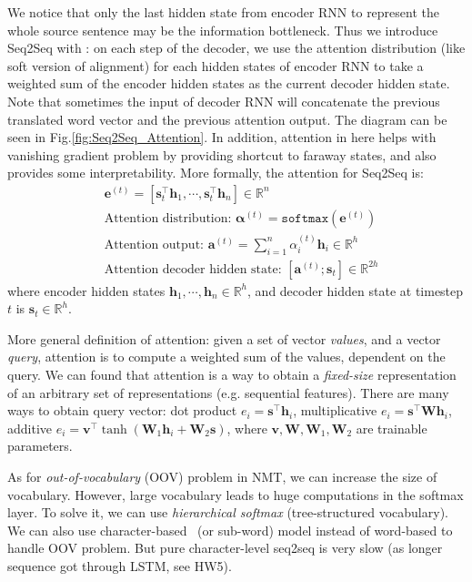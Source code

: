We notice that only the last hidden state from encoder RNN to represent the whole source sentence may be the information bottleneck.
Thus we introduce Seq2Seq with : on each step of the decoder, we use the attention distribution (like soft version of alignment) for each hidden states of encoder RNN to take a weighted sum of the encoder hidden states as the current decoder hidden state.
Note that sometimes the input of decoder RNN will concatenate the previous translated word vector and the previous attention output.
The diagram can be seen in Fig.\ref{fig:Seq2Seq_Attention}.
In addition, attention in here helps with vanishing gradient problem by providing shortcut to faraway states, and also provides some interpretability.
More formally, the attention for Seq2Seq is:
\begin{align}
&\bm{e}^{(t)} = [\bm{s}_t^\top \bm{h}_1, \cdots, \bm{s}_t^\top \bm{h}_n] \in \mathbb{R}^n \nonumber \\
&\text{Attention distribution: } \bm{\alpha}^{(t)} = \texttt{softmax}(\bm{e}^{(t)}) \nonumber \\
&\text{Attention output: } \bm{a}^{(t)} = \sum_{i=1}^n \alpha_i^{(t)} \bm{h}_i \in \mathbb{R}^h \nonumber \\
&\text{Attention decoder hidden state: } [\bm{a}^{(t)}; \bm{s}_t] \in \mathbb{R}^{2h}
\end{align}
where encoder hidden states $\bm{h}_1, \cdots, \bm{h}_n \in \mathbb{R}^h$, and decoder hidden state at timestep $t$ is $\bm{s}_t \in \mathbb{R}^h$.

More general definition of attention: given a set of vector \emph{values}, and a vector \emph{query}, attention is to compute a weighted sum of the values, dependent on the query.
We can found that attention is a way to obtain a \emph{fixed-size} representation of an arbitrary set of representations (e.g. sequential features).
There are many ways to obtain query vector: dot product $e_i = \bm{s}^\top \bm{h}_i$, multiplicative $e_i = \bm{s}^\top \bm{W} \bm{h}_i$, additive $e_i = \bm{v}^\top \tanh (\bm{W}_1 \bm{h}_i + \bm{W}_2 \bm{s})$, where $\bm{v}, \bm{W}, \bm{W}_1, \bm{W}_2$ are trainable parameters.

As for \emph{out-of-vocabulary} (OOV) problem in NMT, we can increase the size of vocabulary.
However, large vocabulary leads to huge computations in the softmax layer.
To solve it, we can use \emph{hierarchical softmax} (tree-structured vocabulary).
We can also use character-based~ (or sub-word) model instead of word-based to handle OOV problem. But pure character-level seq2seq is very slow (as longer sequence got through LSTM, see HW5).

